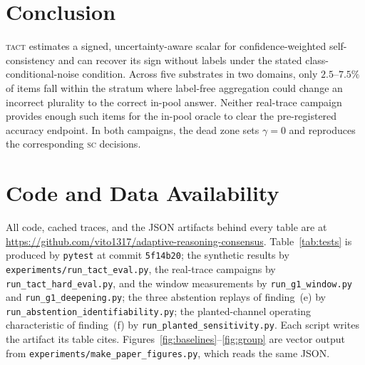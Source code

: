\documentclass[conference]{IEEEtran}
\newcommand{\SC}{\textsc{sc}}
\newcommand{\TACT}{\textsc{tact}}
\begin{document}
\section{Conclusion}
\TACT{} estimates a signed, uncertainty-aware scalar for confidence-weighted
self-consistency and can recover its sign without labels under the stated
class-conditional-noise condition. Across five substrates in two domains, only
$2.5$--$7.5\%$ of items fall within the stratum where label-free aggregation
could change an incorrect plurality to the correct in-pool answer. Neither
real-trace campaign provides enough such items for the in-pool oracle to clear
the pre-registered accuracy endpoint. In both campaigns, the dead zone sets
$\gamma=0$ and reproduces the corresponding \SC{} decisions.

\section*{Code and Data Availability}
All code, cached traces, and the JSON artifacts behind every table are at
\url{https://github.com/vito1317/adaptive-reasoning-consensus}. Table~\ref{tab:tests}
is produced by \texttt{pytest} at commit \texttt{5f14b20}; the synthetic results by
\texttt{experiments/run\_tact\_eval.py}, the real-trace campaigns by
\texttt{run\_tact\_hard\_eval.py}, and the window measurements by
\texttt{run\_g1\_window.py} and \texttt{run\_g1\_deepening.py}; the three
abstention replays of finding~(e) by \texttt{run\_abstention\_identifiability.py};
the planted-channel operating characteristic of finding~(f) by
\texttt{run\_planted\_sensitivity.py}.
Each script
writes the artifact its table cites. Figures~\ref{fig:baselines}--\ref{fig:group}
are vector output from \texttt{experiments/make\_paper\_figures.py}, which reads
the same JSON.

\appendix
\end{document}
